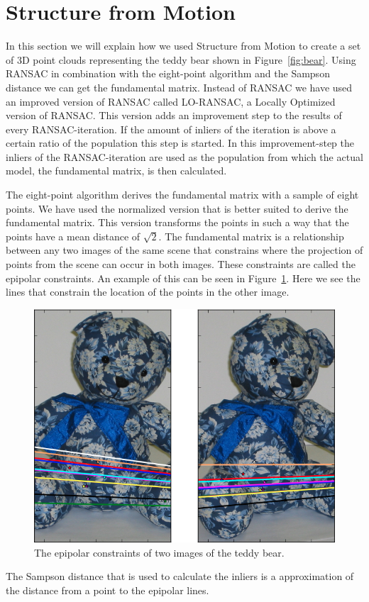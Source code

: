 \section{Structure from Motion}
\label{structure}
In this section we will explain how we used Structure from Motion \cite{SfM} to create a set of 3D point clouds
representing the teddy bear shown in Figure~\ref{fig:bear}.
Using RANSAC \cite{RANSAC} in combination with the eight-point algorithm \cite{eightpoint} and the Sampson distance we can get the fundamental matrix.
Instead of RANSAC we have used an improved version of RANSAC called LO-RANSAC, a Locally Optimized version of RANSAC.
This version adds an improvement step to the results of every RANSAC-iteration. If the amount of inliers of the iteration is above a certain ratio of the population this step is started.
In this improvement-step the inliers of the RANSAC-iteration are used as the population from which the actual model, the fundamental matrix, is then calculated.

The eight-point algorithm derives the fundamental matrix with a sample of eight points.
We have used the normalized version that is better suited to derive the fundamental matrix.
This version transforms the points in such a way that the points have a mean distance of $\sqrt{2}$.
The fundamental matrix is a relationship between any two images of the same scene that constrains where the projection of points from the scene can occur in both images.
These constraints are called the epipolar constraints.
An example of this can be seen in Figure~\ref{fig:epipolar}.
Here we see the lines that constrain the location of the points in the other image.
\begin{figure}[ht]
	\centering
	\includegraphics[width=.5\textwidth]{bear_epi}
	\caption{The epipolar constraints of two images of the teddy bear.}
	\label{fig:epipolar}
\end{figure}

The Sampson distance that is used to calculate the inliers is a approximation of the distance from a point to the epipolar lines.

